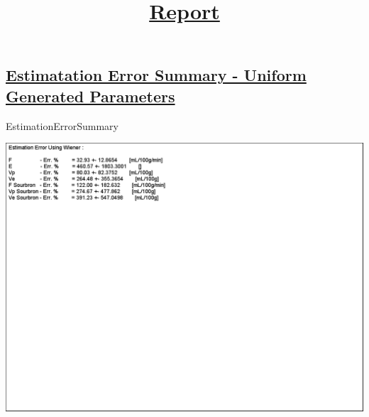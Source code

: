 \documentclass[english]{article}
\begin{document}
\graphicspath{ {\\fmri-guy2\Dropbox\University\Msc\Thesis\General\Matlab Simulations\Flow Extraction\Latest Code\Run_Output\ } }
\title{\underline{Report}}
\maketitle


\subsection*{\underline{Estimatation Error Summary - Uniform Generated Parameters}}

EstimationErrorSummary




\includegraphics[scale=0.7]{Estimation_Error_Summary.png}
\end{document}
